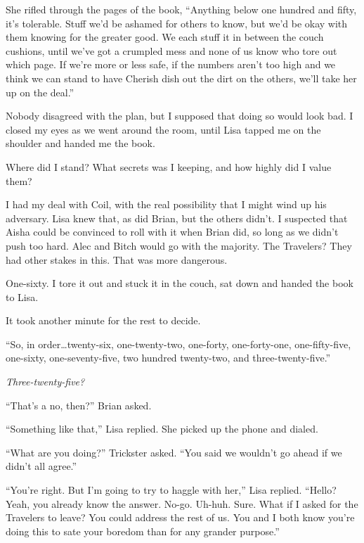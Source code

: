 She rifled through the pages of the book, ``Anything below one hundred and fifty, it's tolerable.  Stuff we'd be ashamed for others to know, but we'd be okay with them knowing for the greater good.  We each stuff it in between the couch cushions, until we've got a crumpled mess and none of us know who tore out which page.  If we're more or less safe, if the numbers aren't too high and we think we can stand to have Cherish dish out the dirt on the others, we'll take her up on the deal.''



Nobody disagreed with the plan, but I supposed that doing so would look bad.  I closed my eyes as we went around the room, until Lisa tapped me on the shoulder and handed me the book.



Where did I stand?  What secrets was I keeping, and how highly did I value them?



I had my deal with Coil, with the real possibility that I might wind up his adversary.  Lisa knew that, as did Brian, but the others didn't.  I suspected that Aisha could be convinced to roll with it when Brian did, so long as we didn't push too hard.  Alec and Bitch would go with the majority.  The Travelers?  They had other stakes in this.  That was more dangerous.



One-sixty.  I tore it out and stuck it in the couch, sat down and handed the book to Lisa.



It took another minute for the rest to decide.



``So, in order\ldots twenty-six, one-twenty-two, one-forty, one-forty-one, one-fifty-five, one-sixty, one-seventy-five, two hundred twenty-two, and three-twenty-five.''



\emph{Three-twenty-five?}



``That's a no, then?'' Brian asked.



``Something like that,'' Lisa replied.  She picked up the phone and dialed.



``What are you doing?''  Trickster asked.  ``You said we wouldn't go ahead if we didn't all agree.''



``You're right.  But I'm going to try to haggle with her,'' Lisa replied.  ``Hello?  Yeah, you already know the answer.  No-go.  Uh-huh.  Sure.  What if I asked for the Travelers to leave?  You could address the rest of us.  You and I both know you're doing this to sate your boredom than for any grander purpose.''



